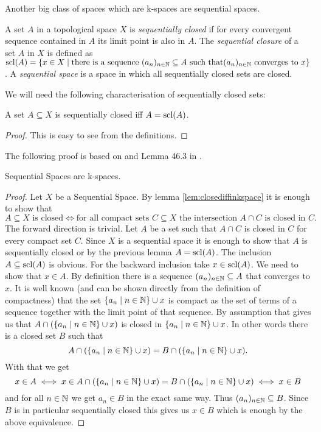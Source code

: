 Another big class of spaces which are k-spaces are sequential spaces. 

\begin{defi}
    A set $A$ in a topological space $X$ is \emph{sequentially closed} if for every convergent sequence contained in $A$ its limit point is also in $A$. 
    The \emph{sequential closure} of a set $A$ in $X$ is defined as $\text{scl}(A) = \{ x \in X \mid \text{there is a sequence } (a_n)_{n \in \mathbb{N}} \subseteq A \text{ such that} (a_n)_{n \in \mathbb{N}} \text{ converges to } x\}$.
    A \emph{sequential space} is a space in which all sequentially closed sets are closed.
\end{defi}

We will need the following characterisation of sequentially closed sets: 

\begin{lem}
    A set $A \subseteq X$ is sequentially closed iff $A = \text{scl}(A)$.
\end{lem}
\begin{proof}
    This is easy to see from the definitions.
\end{proof}

The following proof is based on \cite{Scott2016} and Lemma 46.3 in \cite{Munkres2014}. 

\begin{lem}
    Sequential Spaces are k-spaces.
\end{lem}
\begin{proof}
    Let $X$ be a Sequential Space. 
    By lemma \ref{lem:closediffinkspace} it is enough to show that 
    \[A \subseteq X \text{ is closed} \iff \text{for all compact sets } C \subseteq X \text{ the intersection } A \cap C \text{ is closed in } C.\]
    The forward direction is trivial.
    Let $A$ be a set such that $A \cap C$ is closed in $C$ for every compact set $C$. 
    Since $X$ is a sequential space it is enough to show that $A$ is sequentially closed or by the previous lemma $A  = \text{scl}(A)$.
    The inclusion $A \subseteq \text{scl}(A)$ is obvious. 
    For the backward inclusion take $x \in \text{scl}(A)$. 
    We need to show that $x \in A$.
    By definition there is a sequence $(a_n)_{n \in \mathbb{N}} \subseteq A$ that converges to $x$. 
    It is well known (and can be shown directly from the definition of compactness) that the set $\{a_n \mid n \in \mathbb{N}\} \cup {x}$ is compact as the set of terms of a sequence together with the limit point of that sequence.
    By assumption that gives us that $A \cap (\{a_n \mid n \in \mathbb{N}\} \cup {x})$ is closed in $\{a_n \mid n \in \mathbb{N}\} \cup {x}$. 
    In other words there is a closed set $B$ such that 
    \[A \cap (\{a_n \mid n \in \mathbb{N}\} \cup {x}) = B \cap (\{a_n \mid n \in \mathbb{N}\} \cup {x}).\]
    With that we get
    \[x \in A \iff x \in A \cap (\{a_n \mid n \in \mathbb{N}\} \cup {x}) = B \cap (\{a_n \mid n \in \mathbb{N}\} \cup {x}) \iff x \in B\]
    and for all $n \in \mathbb{N}$ we get $a_n \in B$ in the exact same way. 
    Thus $(a_n)_{n \in \mathbb{N}} \subseteq B$.
    Since $B$ is in particular sequentially closed this gives us $x \in B$ which is enough by the above equivalence.
\end{proof}

